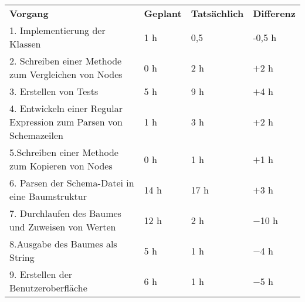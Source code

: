\begin{tabular}{llll}
\rowcolor{heading}\textbf{Vorgang} & \textbf{Geplant} & \textbf{Tatsächlich} & \textbf{Differenz} \\
1. Implementierung der Klassen & 1 h & 0,5 &  -0,5 h\\
\rowcolor{odd}2. Schreiben einer Methode zum Vergleichen von Nodes & 0 h & 2 h & $+$2 h\\
3. Erstellen von Tests & 5 h   & 9 h   & $+$4 h \\
\rowcolor{odd}4. Entwickeln einer Regular Expression zum Parsen von Schemazeilen & 1 h & 3 h  & +2 h\\
5.Schreiben einer Methode zum Kopieren von Nodes & 0 h & 1 h & $+$1 h \\
\rowcolor{odd}6. Parsen der Schema-Datei in eine Baumstruktur & 14 h & 17 h & $+$3 h \\
7. Durchlaufen des Baumes und Zuweisen von Werten & 12 h & 2 h & $-$10 h \\
\rowcolor{odd}8.Ausgabe des Baumes als String & 5 h & 1 h & $-$4 h \\
9. Erstellen der Benutzeroberfläche & 6 h & 1 h & $-$5 h\\
\end{tabular}
